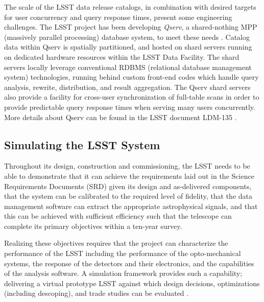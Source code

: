The scale of the LSST data release catalogs, in combination with desired targets for user concurrency
and query response times, present some engineering challenges. The LSST project has been developing
\emph{Qserv}, a shared-nothing MPP (massively parallel processing) database system, to meet these needs
\citep{Wang:2011:QDS:2063348.2063364, 2014era..conf30303B}.
Catalog data within Qserv is spatially partitioned, and hosted on shard servers running on dedicated hardware
resources within the LSST Data Facility.  The shard servers locally leverage conventional RDBMS (relational
database management system) technologies, running behind custom front-end codes which handle query
analysis, rewrite, distribution, and result aggregation.  The Qserv shard servers also provide a facility for
cross-user synchronization of full-table scans in order to provide predictable query response times when
serving many users concurrently. More details about Qserv can be found in
the LSST document LDM-135 \citep{LDM-135}.


\subsection{Simulating the LSST System}

Throughout its design, construction and commissioning, the LSST needs
to be able to demonstrate that it can achieve the requirements laid out
in the Science Requirements Documents (SRD) given its design and
as-delivered components, that the system can be calibrated to the
required level of fidelity, that the data management software can
extract the appropriate astrophysical signals, and that this can be
achieved with sufficient efficiency such that the telescope can
complete its primary objectives within a ten-year survey.


Realizing these objectives requires that the project can characterize
the performance of the LSST including the performance of the
opto-mechanical systems, the response of the detectors and their
electronics, and the capabilities of the analysis software. A
simulation framework provides such a capability; delivering a virtual
prototype LSST against which design decisions, optimizations
(including descoping), and trade studies can be evaluated \citep{2014SPIE.9150E..14C}.


